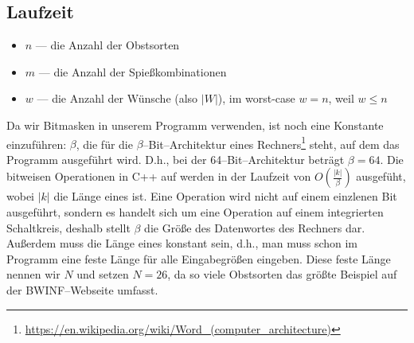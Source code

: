 \subsection{Laufzeit}\label{sec:laufzeit}
\begin{itemize}
  \item $n$ --- die Anzahl der Obstsorten
  \item $m$ --- die Anzahl der Spießkombinationen
  \item $w$ --- die Anzahl der Wünsche (also $|W|$), im worst-case $w = n$, weil $w \leqslant n$
\end{itemize}

Da wir Bitmasken in unserem Programm verwenden, ist noch eine Konstante einzuführen: $\beta$,
die für die $\beta$--Bit--Architektur eines Rechners\footnote{\href{https://en.wikipedia.org/wiki/Word_(computer_architecture)}{https://en.wikipedia.org/wiki/Word\_(computer\_architecture)}}
steht, auf dem das Programm ausgeführt wird. D.h., bei der 64--Bit--Architektur beträgt $\beta = 64$.
Die bitweisen Operationen in C++ auf  werden in der Laufzeit von $O(\frac{|k|}{\beta})$
ausgefüht, wobei $|k|$ die Länge eines  ist. Eine Operation wird nicht auf einem einzlenen Bit ausgeführt, sondern es handelt sich um eine Operation auf einem integrierten Schaltkreis, deshalb
stellt $\beta$ die Größe des Datenwortes des Rechners dar.
Außerdem muss die Länge eines 
konstant sein, d.h., man muss schon im Programm eine feste Länge für alle Eingabegrößen eingeben.
Diese feste Länge nennen wir $N$ und setzen $N =26$, da so viele Obstsorten das größte Beispiel
auf der BWINF--Webseite umfasst.

